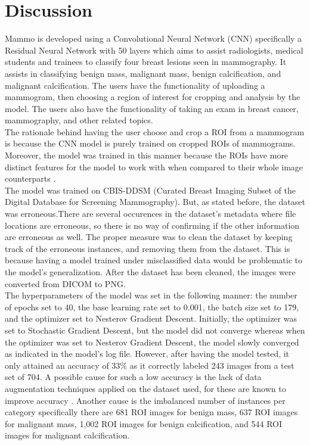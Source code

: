 \section{Discussion}
\qquad Mammo is developed using a Convolutional Neural Network (CNN) specifically a Residual Neural Network with 50 layers which aims to assist radiologists, medical students and trainees to classify four breast lesions seen in mammography. It assists in classifying benign mass, malignant mass, benign calcification, and malignant calcification. The users have the functionality of uploading a mammogram, then choosing a region of interest for cropping and analysis by the model. The users also have the functionality of taking an exam in breast cancer, mammography, and other related topics. \\

	The rationale behind having the user choose and crop a ROI from a mammogram is because the CNN model is purely trained on cropped ROIs of mammograms. Moreover, the model was trained in this manner because the ROIs have more distinct features for the model to work with when compared to their whole image counterparts \cite{CNNmodel}. \\

	The model was trained on CBIS-DDSM (Curated Breast Imaging Subset of the Digital Database for Screening Mammography). But, as stated before, the dataset was erroneous.There are several occurences in the dataset's metadata where file locations are erroneous, so there is no way of confirming if the other information are erroneous as well. The proper measure was to clean the dataset by keeping track of the erroneous instances, and removing them from the dataset. This is because having a model trained under misclassified data would be problematic to the model's generalization. After the dataset has been cleaned, the images were converted from DICOM to PNG. \\

	The hyperparameters of the model was set in the following manner: the number of epochs set to 40, the base learning rate set to 0.001, the batch size set to 179, and the optimizer set to Nesterov Gradient Descent. Initially, the optimizer was set to Stochastic Gradient Descent, but the model did not converge whereas when the optimizer was set to Nesterov Gradient Descent, the model slowly converged as indicated in the model's log file. However, after having the model tested, it only attained an accuracy of 33\% as it correctly labeled 243 images from a test set of 704. A possible cause for such a low accuracy is the lack of data augmentation techniques applied on the dataset used, for these are known to improve accuracy \cite{araujo}. Another cause is the imbalanced number of instances per category specifically there are 681 ROI images for benign mass, 637 ROI images for malignant mass, 1,002 ROI images for benign calcification, and 544 ROI images for malignant calcification. \\

